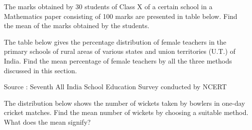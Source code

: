 \item The marks obtained by 30 students of Class X of a certain school in a Mathematics paper consisting of 100 marks are presented in table below. Find the mean of the marks obtained by the students.\\
\begin{table}[!ht]
\centering
{}
\caption{}
\label{table:2.1.1}
\end{table}
%
\item The table below gives the percentage distribution of female teachers in the primary schools of rural areas of various states and union territories (U.T.) of India. Find the mean percentage of female teachers by all the three methods discussed
in this section.\\
\begin{table}[!ht]
\centering
{}
\caption{}
\label{table:2.1.2}
\end{table}
Source : Seventh All India School Education Survey conducted by NCERT
\item The distribution below shows the number of wickets taken by bowlers in one-day cricket matches. Find the mean number of wickets by choosing a suitable
method. What does the mean signify?
\begin{table}[!ht]
\centering
{}
\caption{}
\label{table:2.1.3}
\end{table}
